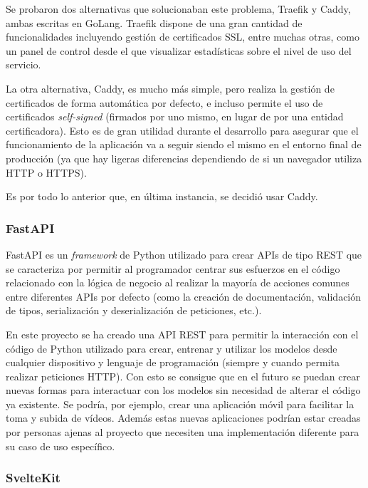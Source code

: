 Se probaron dos alternativas que solucionaban este problema, Traefik y Caddy,
ambas escritas en GoLang. Traefik dispone de una gran cantidad de
funcionalidades incluyendo gestión de certificados SSL, entre muchas otras, como
un panel de control desde el que visualizar estadísticas sobre el nivel de uso
del servicio.

La otra alternativa, Caddy, es mucho más simple, pero realiza la gestión de
certificados de forma automática por defecto, e incluso permite el uso de
certificados \textit{self-signed} (firmados por uno mismo, en lugar de por una
entidad certificadora). Esto es de gran utilidad durante el desarrollo para
asegurar que el funcionamiento de la aplicación va a seguir siendo el mismo en
el entorno final de producción (ya que hay ligeras diferencias dependiendo de si
un navegador utiliza HTTP o HTTPS).

Es por todo lo anterior que, en última instancia, se decidió usar Caddy.

\subsubsection{FastAPI}

FastAPI es un \textit{framework} de Python utilizado para crear APIs de tipo
REST que se caracteriza por permitir al programador centrar sus esfuerzos en el
código relacionado con la lógica de negocio al realizar la mayoría de acciones
comunes entre diferentes APIs por defecto (como la creación de documentación,
validación de tipos, serialización y deserialización de peticiones, etc.).

En este proyecto se ha creado una API REST para permitir la interacción con el
código de Python utilizado para crear, entrenar y utilizar los modelos desde
cualquier dispositivo y lenguaje de programación (siempre y cuando permita
realizar peticiones HTTP). Con esto se consigue que en el futuro se puedan crear
nuevas formas para interactuar con los modelos sin necesidad de alterar el
código ya existente. Se podría, por ejemplo, crear una aplicación móvil para
facilitar la toma y subida de vídeos. Además estas nuevas aplicaciones podrían
estar creadas por personas ajenas al proyecto que necesiten una implementación
diferente para su caso de uso específico.

\subsubsection{SvelteKit}


